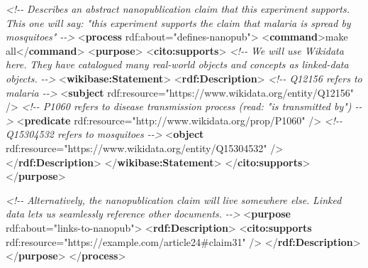 \documentclass[manuscript,authordraft]{acmart}
\newenvironment{Shaded}{}{}
\newcommand{\CommentTok}[1]{\textcolor[rgb]{0.38,0.63,0.69}{\textit{#1}}}
\newcommand{\KeywordTok}[1]{\textcolor[rgb]{0.00,0.44,0.13}{\textbf{#1}}}
\newcommand{\NormalTok}[1]{#1}
\newcommand{\OtherTok}[1]{\textcolor[rgb]{0.00,0.44,0.13}{#1}}
\newcommand{\StringTok}[1]{\textcolor[rgb]{0.25,0.44,0.63}{#1}}
\begin{document}
\begin{Shaded}
\begin{Highlighting}[]
  \CommentTok{\textless{}!{-}{-}}
\CommentTok{  Describes an abstract nanopublication claim that this experiment supports.}
\CommentTok{  This one will say: "this experiment supports the claim that malaria is spread by mosquitoes"}
\CommentTok{  {-}{-}\textgreater{}}
\NormalTok{  \textless{}}\KeywordTok{process}\OtherTok{ rdf:about=}\StringTok{"defines{-}nanopub"}\NormalTok{\textgreater{}}
\NormalTok{    \textless{}}\KeywordTok{command}\NormalTok{\textgreater{}make all\textless{}/}\KeywordTok{command}\NormalTok{\textgreater{}}
\NormalTok{    \textless{}}\KeywordTok{purpose}\NormalTok{\textgreater{}}
\NormalTok{      \textless{}}\KeywordTok{cito:supports}\NormalTok{\textgreater{}}
        \CommentTok{\textless{}!{-}{-}}
\CommentTok{        We will use Wikidata here.}
\CommentTok{        They have catalogued many real{-}world objects and concepts as linked{-}data objects.}
\CommentTok{        {-}{-}\textgreater{}}
\NormalTok{        \textless{}}\KeywordTok{wikibase:Statement}\NormalTok{\textgreater{}}
\NormalTok{          \textless{}}\KeywordTok{rdf:Description}\NormalTok{\textgreater{}}
            \CommentTok{\textless{}!{-}{-} Q12156 refers to malaria {-}{-}\textgreater{}}
\NormalTok{            \textless{}}\KeywordTok{subject}\OtherTok{ rdf:resource=}\StringTok{"https://www.wikidata.org/entity/Q12156"}\NormalTok{ /\textgreater{}}
            \CommentTok{\textless{}!{-}{-} P1060 refers to disease transmission process (read: "is transmitted by") {-}{-}\textgreater{}}
\NormalTok{            \textless{}}\KeywordTok{predicate}\OtherTok{ rdf:resource=}\StringTok{"http://www.wikidata.org/prop/P1060"}\NormalTok{ /\textgreater{}}
            \CommentTok{\textless{}!{-}{-} Q15304532 refers to mosquitoes {-}{-}\textgreater{}}
\NormalTok{            \textless{}}\KeywordTok{object}\OtherTok{ rdf:resource=}\StringTok{"https://www.wikidata.org/entity/Q15304532"}\NormalTok{ /\textgreater{}}
\NormalTok{          \textless{}/}\KeywordTok{rdf:Description}\NormalTok{\textgreater{}}
\NormalTok{        \textless{}/}\KeywordTok{wikibase:Statement}\NormalTok{\textgreater{}}
\NormalTok{      \textless{}/}\KeywordTok{cito:supports}\NormalTok{\textgreater{}}
\NormalTok{    \textless{}/}\KeywordTok{purpose}\NormalTok{\textgreater{}}

    \CommentTok{\textless{}!{-}{-}}
\CommentTok{    Alternatively, the nanopublication claim will live somewhere else.}
\CommentTok{    Linked data lets us seamlessly reference other documents.}
\CommentTok{    {-}{-}\textgreater{}}
\NormalTok{    \textless{}}\KeywordTok{purpose}\OtherTok{ rdf:about=}\StringTok{"links{-}to{-}nanopub"}\NormalTok{\textgreater{}}
\NormalTok{      \textless{}}\KeywordTok{rdf:Description}\NormalTok{\textgreater{}}
\NormalTok{        \textless{}}\KeywordTok{cito:supports}\OtherTok{ rdf:resource=}\StringTok{"https://example.com/article24\#claim31"}\NormalTok{ /\textgreater{}}
\NormalTok{      \textless{}/}\KeywordTok{rdf:Description}\NormalTok{\textgreater{}}
\NormalTok{    \textless{}/}\KeywordTok{purpose}\NormalTok{\textgreater{}}
\NormalTok{  \textless{}/}\KeywordTok{process}\NormalTok{\textgreater{}}


\end{Highlighting}
\end{Shaded}
\end{document}
